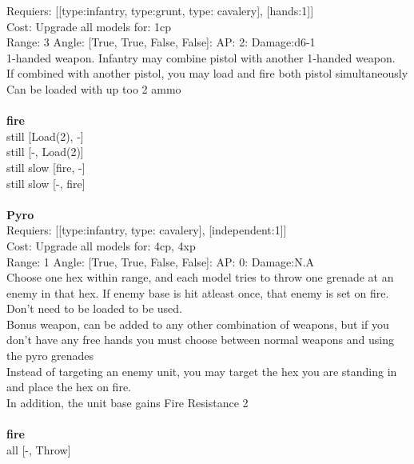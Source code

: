 Requiers: [[type:infantry, type:grunt, type: cavalery], [hands:1]] \\
Cost: Upgrade all models for: 1cp \\


Range: 3  Angle: [True, True, False, False]: AP: 2: Damage:d6-1 \\
1-handed weapon. Infantry may combine pistol with another 1-handed weapon.\\ 
If combined with another pistol, you may load and fire both pistol simultaneously\\ 
Can be loaded with up too 2 ammo\\ 







\ \\ {\bf fire } \\
still [Load(2), -] \\
still [-, Load(2)] \\
still slow [fire, -] \\
still slow [-, fire] \\

\ \\
{\bf Pyro } \\

Requiers: [[type:infantry, type: cavalery], [independent:1]] \\
Cost: Upgrade all models for: 4cp, 4xp \\


Range: 1  Angle: [True, True, False, False]: AP: 0: Damage:N.A \\
Choose one hex within range, and each model tries to throw one grenade at an enemy in that hex. If enemy base is hit atleast once, that enemy is set on fire.\\ 
Don't need to be loaded to be used.\\ 
Bonus weapon, can be added to any other combination of weapons, but if you don't have any free hands you must choose between normal weapons and using the pyro grenades\\ 
Instead of targeting an enemy unit, you may target the hex you are standing in and place the hex on fire.\\ 
In addition, the unit base gains Fire Resistance 2\\ 







\ \\ {\bf fire } \\
all [-, Throw] \\

